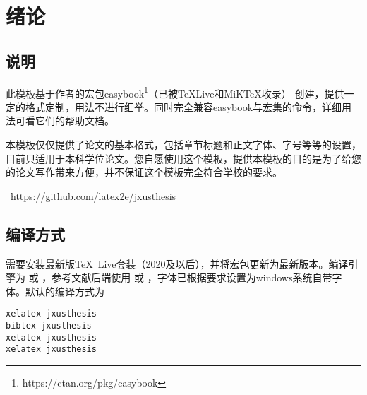 
\chapter{绪论}

\section{说明}
此模板基于作者的宏包easybook\footnote{https://ctan.org/pkg/easybook}（已被\TeX Live和MiK\TeX 收录） 创建，提供一定的格式定制，用法不进行细举。同时完全兼容easybook与\CTeX 宏集的命令，详细用法可看它们的帮助文档。

本模板仅仅提供了论文的基本格式，包括章节标题和正文字体、字号等等的设置，目前只适用于本科学位论文。您自愿使用这个模板，提供本模板的目的是为了给您的论文写作带来方便，并不保证这个模板完全符合学校的要求。

\medskip\noindent
\github~\url{https://github.com/latex2e/jxusthesis}

\section{编译方式}
需要安装最新版\TeX~Live套装（2020及以后），并将宏包更新为最新版本。编译引擎为  或 ，参考文献后端使用 或 ，字体已根据要求设置为windows系统自带字体。默认的编译方式为
\begin{lstlisting}[numbers=none]
xelatex jxusthesis
bibtex jxusthesis
xelatex jxusthesis
xelatex jxusthesis
\end{lstlisting}